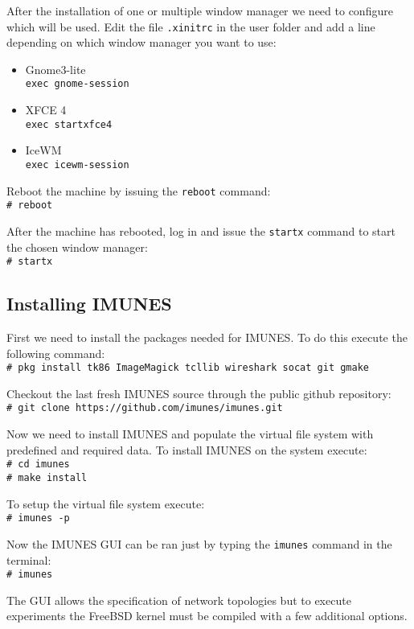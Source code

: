 After the installation of one or multiple window manager we need to configure
which will be used. Edit the file \texttt{.xinitrc} in the user folder and add a line
depending on which window manager you want to use:
\begin{itemize}
\item Gnome3-lite\\
\texttt{exec gnome-session}
\item XFCE 4\\
\texttt{exec startxfce4}
\item IceWM\\
\texttt{exec icewm-session}
\end{itemize}

Reboot the machine by issuing the \texttt{reboot} command:\\
\texttt{\# reboot}

After the machine has rebooted, log in and issue the \texttt{startx} command to
start the chosen window manager:\\
\texttt{\# startx}

\subsection{Installing IMUNES}

First we need to install the packages needed for IMUNES. To do this execute the
following command:\\
\texttt{\# pkg install tk86 ImageMagick tcllib wireshark socat git gmake}

Checkout the last fresh IMUNES source through the public github repository:\\
\texttt{\# git clone https://github.com/imunes/imunes.git}

Now we need to install IMUNES and populate the virtual file system with
predefined and required data. To install IMUNES on the system execute:\\
\texttt{\# cd imunes}\\
\texttt{\# make install}

To setup the virtual file system execute:\\
\texttt{\# imunes -p}

Now the IMUNES GUI can be ran just by typing the \texttt{imunes} command in the
terminal:\\
\texttt{\# imunes}

The GUI allows the specification of network topologies but to execute
experiments the FreeBSD kernel must be compiled with a few additional options.

